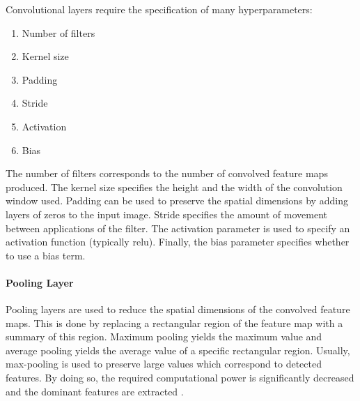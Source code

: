 Convolutional layers require the specification of many hyperparameters:
\begin{enumerate}
  \item Number of filters
  \item Kernel size
  \item Padding
  \item Stride
  \item Activation
  \item Bias
\end{enumerate}

The number of filters corresponds to the number of convolved feature maps produced.
The kernel size specifies the height and the width of the convolution window used.
Padding can be used to preserve the spatial dimensions by adding layers of zeros to the input image.
Stride specifies the amount of movement between applications of the filter.
The activation parameter is used to specify an activation function (typically \acrshort{relu}).
Finally, the bias parameter specifies whether to use a bias term.


\paragraph{Pooling Layer}
Pooling layers are used to reduce the spatial dimensions of the convolved feature maps.
This is done by replacing a rectangular region of the feature map with a summary of this region.
Maximum pooling yields the maximum value and average pooling yields the average value of a specific rectangular region.
Usually, max-pooling is used to preserve large values which correspond to detected features.
By doing so, the required computational power is significantly decreased and the dominant features are extracted \cite[p.~335--339]{dl}.

